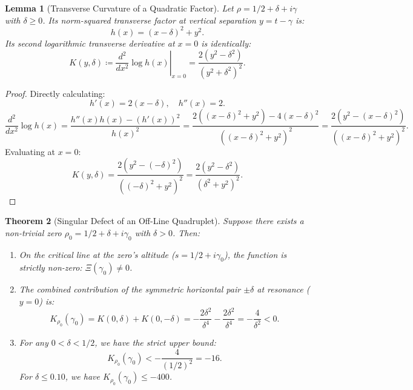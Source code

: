 \documentclass[11pt,a4paper]{article}
\newtheorem{theorem}{Theorem}[section]
\newtheorem{lemma}[theorem]{Lemma}
\theoremstyle{definition}
\theoremstyle{remark}
\begin{document}
\begin{lemma}[Transverse Curvature of a Quadratic Factor]
\label{lem:curvatura_factor_cuad}
Let $\rho = 1/2 + \delta + i\gamma$ with $\delta \ge 0$. Its norm-squared transverse factor at vertical separation $y = t - \gamma$ is:
\begin{equation}
h(x) = (x - \delta)^2 + y^2.
\end{equation}
Its second logarithmic transverse derivative at $x = 0$ is identically:
\begin{equation}
K(y, \delta) \coloneqq \left.\frac{d^2}{dx^2}\log h(x)\right|_{x=0} = \frac{2(y^2 - \delta^2)}{(y^2 + \delta^2)^2}.
\end{equation}
\end{lemma}

\begin{proof}
Directly calculating:
\[
h'(x) = 2(x - \delta), \quad h''(x) = 2.
\]
\[
\frac{d^2}{dx^2}\log h(x) = \frac{h''(x) h(x) - (h'(x))^2}{h(x)^2} = \frac{2((x - \delta)^2 + y^2) - 4(x - \delta)^2}{((x - \delta)^2 + y^2)^2} = \frac{2(y^2 - (x - \delta)^2)}{((x - \delta)^2 + y^2)^2}.
\]
Evaluating at $x = 0$:
\[
K(y, \delta) = \frac{2(y^2 - (-\delta)^2)}{((-\delta)^2 + y^2)^2} = \frac{2(y^2 - \delta^2)}{(\delta^2 + y^2)^2}.
\]
\end{proof}

\begin{theorem}[Singular Defect of an Off-Line Quadruplet]
\label{thm:defecto_cuadruplete_experto}
Suppose there exists a non-trivial zero $\rho_0 = 1/2 + \delta + i\gamma_0$ with $\delta > 0$. Then:
\begin{enumerate}
    \item On the critical line at the zero's altitude ($s = 1/2 + i\gamma_0$), the function is strictly non-zero: $\Xi(\gamma_0) \neq 0$.
    \item The combined contribution of the symmetric horizontal pair $\pm \delta$ at resonance ($y = 0$) is:
    \begin{equation}
    K_{\rho_0}(\gamma_0) = K(0, \delta) + K(0, -\delta) = -\frac{2\delta^2}{\delta^4} - \frac{2\delta^2}{\delta^4} = -\frac{4}{\delta^2} < 0.
    \end{equation}
    \item For any $0 < \delta < 1/2$, we have the strict upper bound:
    \begin{equation}
    K_{\rho_0}(\gamma_0) < -\frac{4}{(1/2)^2} = -16.
    \end{equation}
    For $\delta \le 0.10$, we have $K_{\rho_0}(\gamma_0) \le -400$.
\end{enumerate}
\end{theorem}
\end{document}
